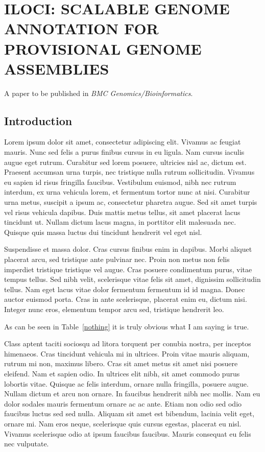 \chapter{ILOCI: SCALABLE GENOME ANNOTATION FOR PROVISIONAL GENOME ASSEMBLIES}

A paper to be published in \textit{BMC Genomics/Bioinformatics}.

\section{Introduction}

Lorem ipsum dolor sit amet, consectetur adipiscing elit. Vivamus ac feugiat mauris. Nunc sed felis a purus finibus cursus in eu ligula. Nam cursus iaculis augue eget rutrum. Curabitur sed lorem posuere, ultricies nisl ac, dictum est. Praesent accumsan urna turpis, nec tristique nulla rutrum sollicitudin. Vivamus eu sapien id risus fringilla faucibus. Vestibulum euismod, nibh nec rutrum interdum, ex urna vehicula lorem, et fermentum tortor nunc at nisi. Curabitur urna metus, suscipit a ipsum ac, consectetur pharetra augue. Sed sit amet turpis vel risus vehicula dapibus. Duis mattis metus tellus, sit amet placerat lacus tincidunt ut. Nullam dictum lacus magna, in porttitor elit malesuada nec. Quisque quis massa luctus dui tincidunt hendrerit vel eget nisl.

Suspendisse et massa dolor. Cras cursus finibus enim in dapibus. Morbi aliquet placerat arcu, sed tristique ante pulvinar nec. Proin non metus non felis imperdiet tristique tristique vel augue. Cras posuere condimentum purus, vitae tempus tellus. Sed nibh velit, scelerisque vitae felis sit amet, dignissim sollicitudin tellus. Nam eget lacus vitae dolor fermentum fermentum id id magna. Donec auctor euismod porta. Cras in ante scelerisque, placerat enim eu, dictum nisi. Integer nunc eros, elementum tempor arcu sed, tristique hendrerit leo.

As can be seen in Table~\ref{nothing} it is truly obvious what I am saying is true.

\begin{table}[h!tb] \centering
{}
\label{nothing}
\vspace{ 2 in}
\end{table}

Class aptent taciti sociosqu ad litora torquent per conubia nostra, per inceptos himenaeos. Cras tincidunt vehicula mi in ultrices. Proin vitae mauris aliquam, rutrum mi non, maximus libero. Cras sit amet metus sit amet nisi posuere eleifend. Nam et sapien odio. In ultrices elit nibh, sit amet commodo purus lobortis vitae. Quisque ac felis interdum, ornare nulla fringilla, posuere augue. Nullam dictum et arcu non ornare. In faucibus hendrerit nibh nec mollis. Nam eu dolor sodales mauris fermentum ornare ac ac ante. Etiam non odio sed odio faucibus luctus sed sed nulla. Aliquam sit amet est bibendum, lacinia velit eget, ornare mi. Nam eros neque, scelerisque quis cursus egestas, placerat eu nisl. Vivamus scelerisque odio at ipsum faucibus faucibus. Mauris consequat eu felis nec vulputate.

